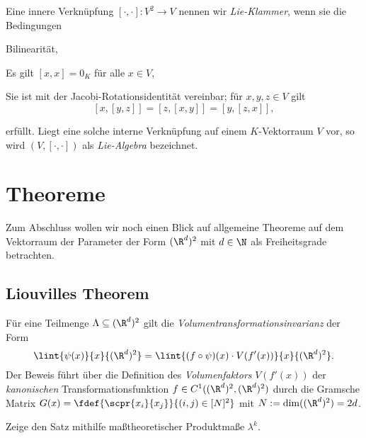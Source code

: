 \documentclass[../WiSe22ANA3.tex]{subfiles}
\begin{document}
			\begin{info}
				Eine innere Verknüpfung $[\cdot,\cdot]:V^2\to V$ nennen wir \emph{Lie-Klammer}, wenn sie die Bedingungen 
				\begin{clist}
					\item Bilinearität,
					\item Es gilt $[x,x]=0_K$ für alle $x\in V$, 
					\item Sie ist mit der Jacobi-Rotationsidentität vereinbar; für $x,y,z\in V$ gilt 
 					$$[x,[y,z]]=[z,[x,y]]=[y,[z,x]],$$
				\end{clist}
				erfüllt. Liegt eine solche interne Verknüpfung auf einem $K$-Vektorraum $V$ vor, so wird $(V,[\cdot,\cdot])$ als \emph{Lie-Algebra} bezeichnet. 
			\end{info}
			
		\section{Theoreme}
			Zum Abschluss wollen wir noch einen Blick auf allgemeine Theoreme auf dem Vektorraum der Parameter der Form $(\R^d)^2$ mit $d\in\N$ als Freiheitsgrade betrachten. 
			\subsection*{Liouvilles Theorem}	
				Für eine Teilmenge $\Lambda\subseteq (\R^d)^2$ gilt die \emph{Volumentransformationsinvarianz} der Form 
				$$\lint{\psi(x)}{x}{(\R^d)^2}=\lint{(f\circ\psi)(x)\cdot V(f'(x))}{x}{(\R^d)^2}.$$
				Der Beweis führt über die Definition des \emph{Volumenfaktors} $V(f'(x))$ der \emph{kanonischen} Transformationsfunktion $f\in C^1((\R^d)^2,(\R^d)^2)$ durch die Gramsche Matrix   $G(x)=\fdef{\scpr{x_i}{x_j}}{(i,j)\in[N]^2}$ mit $N:=\dim((\R^d)^2)=2d$.
				\begin{Aufgabe}
					\nr Zeige den Satz mithilfe maßtheoretischer Produktmaße $\lambda^k$. 
				\end{Aufgabe}
				
\end{document}
